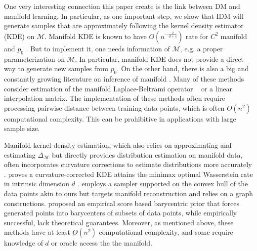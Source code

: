 \documentclass{article}
\def\calM{\mathcal{M}}
\begin{document}
One very interesting connection this paper create is the link between DM and manifold learning. In particular, as one important step, we show that IDM will generate samples that are approximately following the kernel density estimator (KDE) on $\calM$. Manifold KDE is known to have $O(n^{-\frac{2}{d+4}})$ rate for $C^2$ manifold and $p_0$ \cite{ozakin2009submanifold}. But to implement it, one needs information of $\calM$, e.g. a proper parameterization on $\calM$. In particular, manifold KDE does not provide a direct way to generate new samples from $p_0$. On the other hand, there is also a big and constantly growing literature on inference of manifold \cite{Roweis2000,BelkinNiyogi2003,coifman2006diffusion,Singer2006,khoo2024temporal}. Many of these methods consider estimation of the manifold Laplace-Beltrami operator ~\cite{hsu2002stochastic}  or a linear interpolation matrix. The implementation of these methods often require processing pairwise distance between training data points, which is often $O(n^2)$ computational complexity. This can be prohibitive in applications with large sample size.


Manifold kernel density estimation, which also relies on approximating and estimating \(\Delta_{\mathcal{M}}\) but directly provides distribution estimation on manifold data, often incorporates curvature corrections to estimate distributions more accurately \cite{Pelletier2005,HenryRodriguez2009,KimPark2013}.\cite{divol2022measure} proves a curvature-corrected KDE attains the minimax optimal Wasserstein rate in intrinsic dimension \(d\) \cite{niles2022minimax}. \cite{divol2021minimax} employs a sampler supported on the convex hull of the data points akin to ours but targets manifold reconstruction and relies on a  graph constructions. \cite{scarvelis2023closed} proposed an empirical score based barycentric prior that forces generated points into barycenters of subsets of data points, while empirically successful, lack theoretical guarantees. 
Moreover, as mentioned above, these methods have at least \(O(n^2)\) computational complexity, and some require knowledge of \(d\) or oracle access the the manifold.
\end{document}
